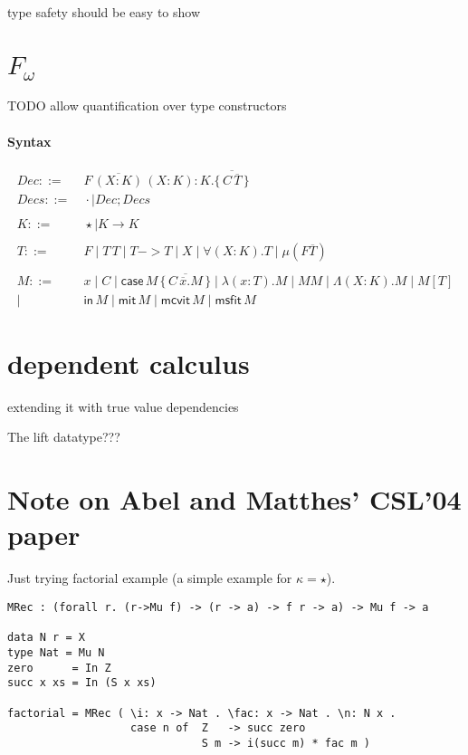 \documentclass[a4paper,12pt]{book}
\newcommand{\Fw}[0]{\ensuremath{F_\omega}}
\newcommand{\case}[0]{\ensuremath{\mathsf{case}}}
\newcommand{\miter}[0]{\ensuremath{\mathsf{mit}}}
\newcommand{\mcvit}[0]{\ensuremath{\mathsf{mcvit}}}
\newcommand{\msfit}[0]{\ensuremath{\mathsf{msfit}}}
\newcommand{\In}[0]{\ensuremath{\mathsf{in}}}
\begin{document}
type safety should be easy to show



\section{\Fw}
TODO allow quantification over type constructors

\paragraph{Syntax}
\begin{align*}
Dec  ::=&~ F\,\overline{(X:K)}\,(X:K) : K.\{\,\overline{C\,\overline{T}}\,\} \\
Decs ::=&~ \cdot \mid Dec;Decs
\\ ~ \\
K ::=&~ \star \mid K \to K
\\ ~ \\
T ::=&~ F \mid T\,T
 \mid   T -> T
 \mid   X 
 \mid   \forall(X:K) . T
 \mid   \mu(F\overline{T})
\\ ~ \\
M ::=&~ x \mid C
 \mid   \case\,M\,\{\,\overline{C\,\overline{x}.M}\,\}
 \mid   \lambda(x:T). M
 \mid   M M
 \mid   \Lambda(X:K). M
 \mid   M [T] \\
 \mid&~ \In\,M
 \mid   \miter\,M
 \mid   \mcvit\,M
 \mid   \msfit\,M
\end{align*}

\section{dependent calculus}
extending it with true value dependencies

The lift datatype???

\section{Note on Abel and Matthes' CSL'04 paper}

Just trying factorial example (a simple example for $\kappa=\star$).

\begin{verbatim}
MRec : (forall r. (r->Mu f) -> (r -> a) -> f r -> a) -> Mu f -> a

data N r = X 
type Nat = Mu N
zero      = In Z
succ x xs = In (S x xs)

factorial = MRec ( \i: x -> Nat . \fac: x -> Nat . \n: N x .
                   case n of  Z   -> succ zero
                              S m -> i(succ m) * fac m )
\end{verbatim}
\end{document}

